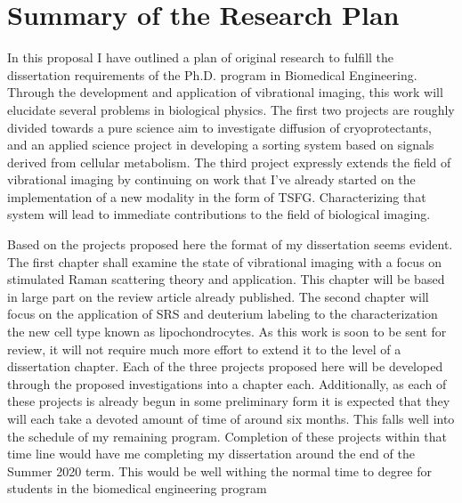 
\chapter{Summary of the Research Plan} %

\label{Chapter4} %


In this proposal I have outlined a plan of original research to fulfill the dissertation requirements of the Ph.D. program in Biomedical Engineering.  Through the development and application of vibrational imaging, this work will elucidate several problems in biological physics.  The first two projects are roughly divided towards a pure science aim to investigate diffusion of cryoprotectants, and an applied science project in developing a sorting system based on signals derived from cellular metabolism.  The third project expressly extends the field of vibrational imaging by continuing on work that I've already started on the implementation of a new modality in the form of TSFG.  Characterizing that system will lead to immediate contributions to the field of biological imaging.

Based on the projects proposed here the format of my dissertation seems evident.  The first chapter shall examine the state of vibrational imaging with a focus on stimulated Raman scattering theory and application.  This chapter will be based in large part on the review article already published.  The second chapter will focus on the application of SRS and deuterium labeling to the characterization the new cell type known as lipochondrocytes.  As this work is soon to be sent for review, it will  not require much more effort to extend it to the level of a dissertation chapter.  Each of the three projects proposed here will be developed through the proposed investigations into a chapter each.  Additionally, as each of these projects is already begun in some preliminary form it is expected that they will each take a devoted amount of time of around six months.  This falls well into the schedule of my remaining program.  Completion of these projects within that time line would have me completing my dissertation around the end of the Summer 2020 term. This would be well withing the normal time to degree for students in the biomedical engineering program